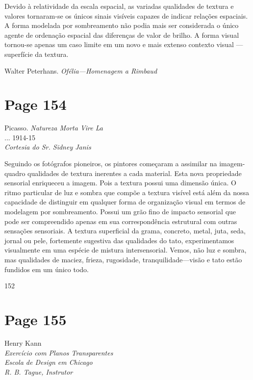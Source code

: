 \documentclass[a4paper]{article}
\begin{document}
Devido à relatividade da escala espacial, as variadas qualidades de textura e valores tornaram-se os únicos sinais visíveis capazes de indicar relações espaciais. A forma modelada por sombreamento não podia mais ser considerada o único agente de ordenação espacial das diferenças de valor de brilho. A forma visual tornou-se apenas um caso limite em um novo e mais extenso contexto visual --- superfície da textura.

Walter Peterhans. \textit{Ofélia---Homenagem a Rimbaud}

\newpage
\section*{Page 154}

\begin{flushleft}
Picasso. \textit{Natureza Morta Vire La} \\
... 1914-15 \\
\textit{Cortesia do Sr. Sidney Janis}
\end{flushleft}

Seguindo os fotógrafos pioneiros, os pintores começaram a assimilar na imagem-quadro qualidades de textura inerentes a cada material. Esta nova propriedade sensorial enriqueceu a imagem. Pois a textura possui uma dimensão única. O ritmo particular de luz e sombra que compõe a textura visível está além da nossa capacidade de distinguir em qualquer forma de organização visual em termos de modelagem por sombreamento. Possui um grão fino de impacto sensorial que pode ser compreendido apenas em sua correspondência estrutural com outras sensações sensoriais. A textura superficial da grama, concreto, metal, juta, seda, jornal ou pele, fortemente sugestiva das qualidades do tato, experimentamos visualmente em uma espécie de mistura intersensorial. Vemos, não luz e sombra, mas qualidades de maciez, frieza, rugosidade, tranquilidade---visão e tato estão fundidos em um único todo.

\par
152

\newpage
\section*{Page 155}

\raggedright

Henry Kann \\
\textit{Exercício com Planos Transparentes} \\
\textit{Escola de Design em Chicago} \\
\textit{R. B. Tague, Instrutor}
\end{document}
